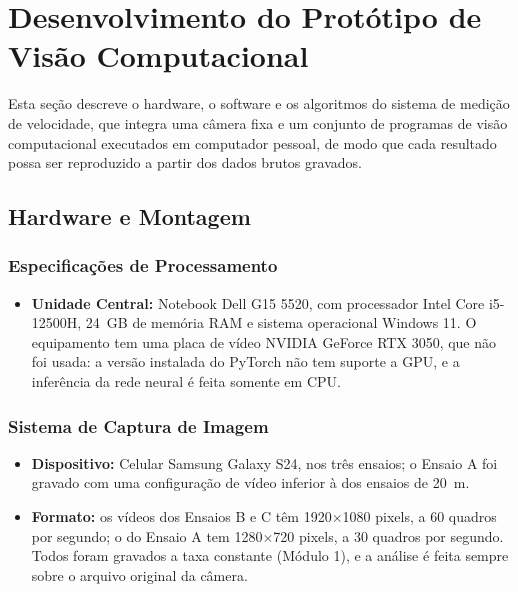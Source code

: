 \documentclass[
    12pt,               %
    openright,          %
    twoside,            %
    a4paper,            %
    chapter=TITLE,      %
    english,            %
    brazil              %
    ]{abntex2}
\begin{document}
\section{Desenvolvimento do Protótipo de Visão Computacional}

Esta seção descreve o hardware, o software e os algoritmos do sistema de medição de velocidade, que integra uma câmera fixa e um conjunto de programas de visão computacional executados em computador pessoal, de modo que cada resultado possa ser reproduzido a partir dos dados brutos gravados.

\subsection{Hardware e Montagem}

\subsubsection{Especificações de Processamento}
\begin{itemize}
    \item \textbf{Unidade Central:} Notebook Dell G15 5520, com processador Intel Core i5-12500H, 24~GB de memória RAM e sistema operacional Windows 11. O equipamento tem uma placa de vídeo NVIDIA GeForce RTX 3050, que não foi usada: a versão instalada do PyTorch não tem suporte a GPU, e a inferência da rede neural é feita somente em CPU.
\end{itemize}

\subsubsection{Sistema de Captura de Imagem}
\begin{itemize}
    \item \textbf{Dispositivo:} Celular Samsung Galaxy S24, nos três ensaios; o Ensaio A foi gravado com uma configuração de vídeo inferior à dos ensaios de 20~m.
    \item \textbf{Formato:} os vídeos dos Ensaios B e C têm 1920$\times$1080 pixels, a 60 quadros por segundo; o do Ensaio A tem 1280$\times$720 pixels, a 30 quadros por segundo. Todos foram gravados a taxa constante (Módulo 1), e a análise é feita sempre sobre o arquivo original da câmera.
\end{itemize}
\end{document}
